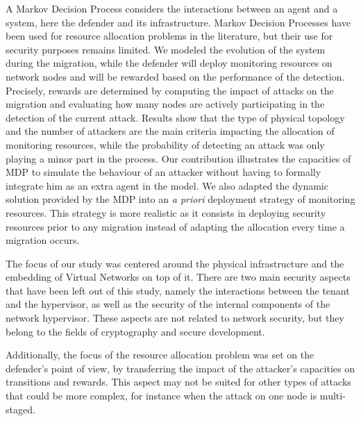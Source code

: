 A Markov Decision Process considers the interactions between an agent and a system, here the defender and its infrastructure. Markov Decision Processes have been used for resource allocation problems in the literature, but their use for security purposes remains limited. We modeled the evolution of the system during the migration, while the defender will deploy monitoring resources on network nodes and will be rewarded based on the performance of the detection.
Precisely, rewards are determined by computing the impact of attacks on the migration and evaluating how many nodes are actively participating in the detection of the current attack.
Results show that the type of physical topology and the number of attackers are the main criteria impacting the allocation of monitoring resources, while the probability of detecting an attack was only playing a minor part in the process. 
Our contribution illustrates the capacities of MDP to simulate the behaviour of an attacker without having to formally integrate him as an extra agent in the model.
We also adapted the dynamic solution provided by the MDP into an \textit{a priori} deployment strategy of monitoring resources. This strategy is more realistic as it consists in deploying security resources prior to any migration instead of adapting the allocation every time a migration occurs.

The focus of our study was centered around the physical infrastructure and the embedding of Virtual Networks on top of it.
There are two main security aspects that have been left out of this study, namely the interactions between the tenant and the hypervisor, as well as the security of the internal components of the network hypervisor. These aspects are not related to network security, but they belong to the fields of cryptography and secure development.

Additionally, the focus of the resource allocation problem was set on the defender's point of view, by transferring the impact of the attacker's capacities on transitions and rewards. This aspect may not be suited for other types of attacks that could be more complex, for instance when the attack on one node is multi-staged.

